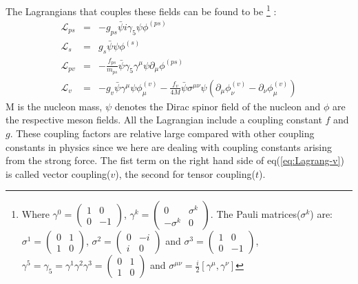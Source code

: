 The Lagrangians that couples these fields can be found to be
\footnote{
Where
$\gamma^0=\left(
\begin{array}{rr}
1&0\\
0&-1
\end{array}\right)
$,
$\gamma^k=\left(
\begin{array}{rr}
0&\sigma^k\\
-\sigma^k &0
\end{array}\right)
$. The Pauli matrices($\sigma^k$) are:
%
$\sigma^1=\left(
\begin{array}{rr}
0&1\\
1&0
\end{array}\right)
$,
$\sigma^2=\left(
\begin{array}{rr}
0&-i\\
i&0
\end{array}\right)
$ and
$\sigma^3=\left(
\begin{array}{rr}
1&0\\
0&-1
\end{array}\right)
$,
$\gamma^5=\gamma_5=\gamma^1\gamma^2\gamma^3=\left(
\begin{array}{rr}
0&1\\
1&0
\end{array}\right)$
and
$\sigma^{\mu\nu}=\frac{i}{2}[\gamma^\mu,\gamma^\nu]$
}
:
\begin{eqnarray}\label{eq:Lagrang-ps}
{\mathcal L}_{ps}&=&-g_{ps}\bar{\psi}i\gamma_5\psi\phi^{(ps)}\\
{\mathcal L}_{s}&=&g_{s}\bar{\psi}\psi\phi^{(s)}\\
\label{eq:Lagrang-pv}
{\mathcal L}_{pv}&=&-\frac{f_{ps}}{m_{ps}}\bar{\psi}\gamma_5\gamma^\mu\psi\partial_\mu\phi^{(ps)}\\
\label{eq:Lagrang-v}
{\mathcal L}_{v}&=&-g_{v}\bar{\psi}\gamma^\mu\psi\phi^{(v)}_\mu-\frac{f_v}{4M}\bar{\psi}\sigma^{\mu\nu}\psi(
\partial_\mu\phi^{(v)}_\nu-\partial_\nu\phi^{(v)}_{\mu})
\end{eqnarray}
M is the nucleon mass, $\psi$ denotes the Dirac spinor field of the nucleon and $\phi$ are the respective meson fields.
All the Lagrangian include a coupling constant $f$ and $g$. These coupling factors are relative large compared with other coupling 
constants in physics since we here are dealing with coupling constants arising from
the strong force.
The fist term on the right hand side of eq(\ref{eq:Lagrang-v}) is called vector coupling($v$), the second
for tensor coupling($t$).

